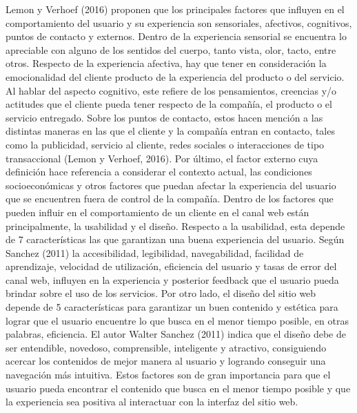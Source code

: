 Lemon y Verhoef (2016) proponen que los principales factores que influyen en el comportamiento del usuario y su experiencia son sensoriales, afectivos, cognitivos, puntos de contacto y externos. Dentro de la experiencia sensorial se encuentra lo apreciable con alguno de los sentidos del cuerpo, tanto vista, olor, tacto, entre otros. Respecto de la experiencia afectiva, hay que tener en consideración la emocionalidad del cliente producto de la experiencia del producto o del servicio. Al hablar del aspecto cognitivo, este refiere de los pensamientos, creencias y/o actitudes que el cliente pueda tener respecto de la compañía, el producto o el servicio entregado. Sobre los puntos de contacto, estos hacen mención a las distintas maneras en las que el cliente y la compañía entran en contacto, tales como la publicidad, servicio al cliente, redes sociales o interacciones de tipo transaccional (Lemon y Verhoef, 2016). Por último, el factor externo cuya definición hace referencia a considerar el contexto actual, las condiciones socioeconómicas y otros factores que puedan afectar la experiencia del usuario que se encuentren fuera de control de la compañía. 
Dentro de los factores que pueden influir en el comportamiento de un cliente en el canal web están principalmente, la usabilidad y el diseño. Respecto a la usabilidad, esta depende de 7 características las que garantizan una buena experiencia del usuario. Según Sanchez (2011) la accesibilidad, legibilidad, navegabilidad, facilidad de aprendizaje, velocidad de utilización, eficiencia del usuario y tasas de error del canal web, influyen en la experiencia y posterior feedback que el usuario pueda brindar sobre el uso de los servicios. 
Por otro lado, el diseño del sitio web depende de 5 características para garantizar un buen contenido y estética para lograr que el usuario encuentre lo que busca en el menor tiempo posible, en otras palabras, eficiencia. El autor Walter Sanchez (2011) indica que el diseño debe de ser entendible, novedoso, comprensible, inteligente y atractivo, consiguiendo acercar los contenidos de mejor manera al usuario y logrando conseguir una navegación más intuitiva. Estos factores son de gran importancia para que el usuario pueda encontrar el contenido que busca en el menor tiempo posible y que la experiencia sea positiva al interactuar con la interfaz del sitio web. 
